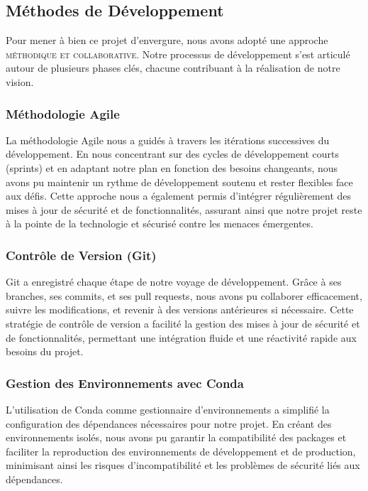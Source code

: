 \subsection{Méthodes de Développement}

Pour mener à bien ce projet d'envergure, nous avons adopté une approche \textsc{méthodique et collaborative}. Notre processus de développement s'est articulé autour de plusieurs phases clés, chacune contribuant à la réalisation de notre vision.

\subsubsection{Méthodologie Agile}

La méthodologie Agile nous a guidés à travers les itérations successives du développement. En nous concentrant sur des cycles de développement courts (sprints) et en adaptant notre plan en fonction des besoins changeants, nous avons pu maintenir un rythme de développement soutenu et rester flexibles face aux défis. Cette approche nous a également permis d'intégrer régulièrement des mises à jour de sécurité et de fonctionnalités, assurant ainsi que notre projet reste à la pointe de la technologie et sécurisé contre les menaces émergentes.

\subsubsection{Contrôle de Version (Git)}

Git a enregistré chaque étape de notre voyage de développement. Grâce à ses branches, ses commits, et ses pull requests, nous avons pu collaborer efficacement, suivre les modifications, et revenir à des versions antérieures si nécessaire. Cette stratégie de contrôle de version a facilité la gestion des mises à jour de sécurité et de fonctionnalités, permettant une intégration fluide et une réactivité rapide aux besoins du projet.

\subsubsection{Gestion des Environnements avec Conda}

L'utilisation de Conda comme gestionnaire d'environnements a simplifié la configuration des dépendances nécessaires pour notre projet. En créant des environnements isolés, nous avons pu garantir la compatibilité des packages et faciliter la reproduction des environnements de développement et de production, minimisant ainsi les risques d'incompatibilité et les problèmes de sécurité liés aux dépendances.

